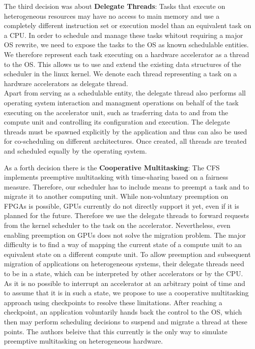 \documentclass[a4paper,13pt]{article}
\begin{document}
\begin{multicols}{2}
The third decision was about {\bf Delegate Threads}: Tasks that execute on heterogeneous resources may have
no access to main memory and use a completely different instruction set or execution model than an
equivalent task on a CPU. In order to schedule and manage these tasks whitout requiring a major OS
rewrite, we need to expose the tasks to the OS as known schedulable entities. We therefore represent
each task executing on a hardware accelerator  as a thread  to the OS. This allows us to use and 
extend  the existing data structures of the scheduler  in the linux kernel. We denote each thread 
representing a task on a hardware accelerators as delegate thread.\\
Apart from serving as a schedulable entity, the delegate thread also performs all operating system
interaction and managment operations on behalf of the task executing on the accelerator unit, such as
trasferring  data to and from the compute unit and controlling its configuration and execution.
The delegate threads must be spawned explicitly by the application and thus can also be used for
co-scheduling on different architectures. Once created, all threads are treated and scheduled equally
by the operating system.

As a forth decision there is the {\bf Cooperative Multitasking}: The CFS implements preemptive multitasking
with time-sharing based on a fairness measure. Therefore, our scheduler has to include means to 
preempt a task and to migrate it to another computing unit. While non-voluntary preemption on FPGAs is
possible, GPUs currently do not directly support it yet, even if it is planned for the future.
Therefore we use the delegate threads to forward requests from the kernel scheduler to the task on 
the accelerator.
Nevertheless, even enabling preemption on GPUs does not solve the migration problem. The major 
difficulty is to find a way of mapping  the current  state of a compute unit to an equivalent state
on a different compute unit. To allow preemption and subsequent migration of applications on 
heterogeneous systems, their delegate threads need to be in a state, which can be interpreted by other
accelerators or by the CPU. As it is no possible to interrupt an accelerator at an arbitrary point
of time and to assume that it is in such a state, we propose to use a cooperative multitasking 
approach using checkpoints  to resolve these limitations. After reaching a checkpoint, an application
voluntarily hands back the control to the OS, which then may perform scheduling decisions to suspend 
and migrate a thread at these points. The authors beleive that this currently is the only way to 
simulate preemptive  multitasking on heterogeneous hardware.


\end{multicols}
\end{document}
